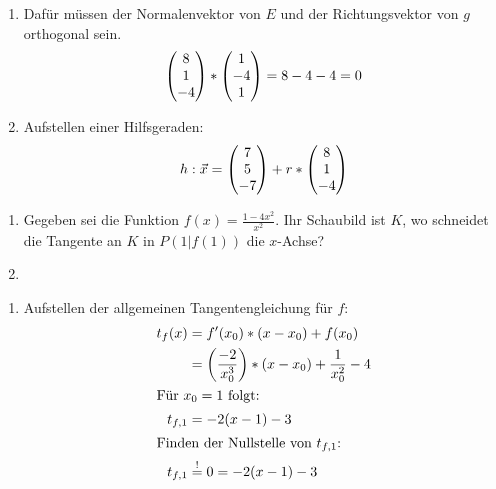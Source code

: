\begin{lsg}{}
	\begin{enumerate}
		\item Dafür müssen der Normalenvektor von $E$ und der Richtungsvektor von $g$ orthogonal sein.
		\begin{equation*}
			\begin{pmatrix} 8\\ 1 \\-4 \end{pmatrix}*\begin{pmatrix} 1\\-4\\1 \end{pmatrix}=8-4-4=0
		\end{equation*}
		\item Aufstellen einer Hilfsgeraden:
		\begin{align*}
			h: \vec x=\begin{pmatrix} 7\\5\\-7 \end{pmatrix}+r*\begin{pmatrix} 8\\ 1 \\-4 \end{pmatrix}
		\end{align*}
	\end{enumerate}
\end{lsg}





  \begin{enumerate}
    \item Gegeben sei die Funktion $f(x) = \frac{1-4x^2}{x^2}$. Ihr Schaubild ist $K$, wo schneidet die Tangente an $K$ in $P(1|f(1))$ die $x$-Achse?
		\item
  \end{enumerate}
	\begin{lsg}{}
		\begin{enumerate}
			\item Aufstellen der allgemeinen Tangentengleichung für $f$:
			\begin{align*}
				t_f(x)&=f'(x_0)*(x-x_0)+f(x_0)\\
							&=\left(\frac{-2}{x_0^3}\right)*(x-x_0)+\frac{1}{x_0^2}-4\\
				\intertext{Für $x_0=1$ folgt:}
				t_{f,1}&=-2(x-1)-3\\
				\intertext{Finden der Nullstelle von $t_{f,1}$:}
				t_{f,1}&\overset!=0=-2(x-1)-3\\
			\end{align*}
		\end{enumerate}
	\end{lsg}



